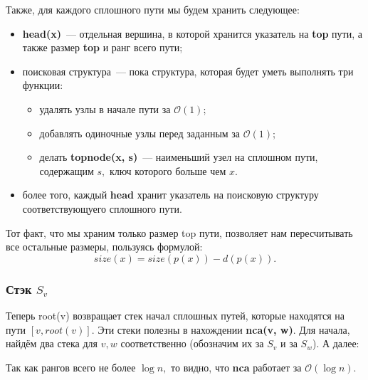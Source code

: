 Также, для каждого сплошного пути мы будем хранить следующее:
\begin{itemize}
    \item \textbf{head(x)}~--- отдельная вершина, в которой хранится указатель на \textbf{top} пути, а также размер \textbf{top} и ранг всего пути;
    \item поисковая структура~--- пока структура, которая будет уметь выполнять три функции:
    \begin{itemize}
        \item удалять узлы в начале пути за $\mathcal{O}(1)$;
        \item добавлять одиночные узлы перед заданным за $\mathcal{O}(1)$;
        \item делать \textbf{topnode(x, s)}~--- наименьший узел на сплошном пути, содержащим $s,$ ключ которого больше чем $x.$
    \end{itemize}
    \item более того, каждый \textbf{head} хранит указатель на поисковую структуру соответствующуего сплошного пути.
\end{itemize}

Тот факт, что мы храним только размер top пути, позволяет нам пересчитывать все остальные размеры, пользуясь формулой:
$$size(x) = size(p(x)) - d(p(x)).$$


\subsubsection{Стэк $S_v$}
Теперь root(v) возвращает стек начал сплошных путей, которые находятся на пути $[v, root(v)].$
Эти стеки полезны в нахождении \textbf{nca(v, w)}.  Для начала, найдём два стека для $v, w$ соответственно (обозначим их за $S_v$ и за $S_w$). А далее:

\begin{algorithmic}[1]
        \State{}
    \Else
        \EndWhile
            \State{}
        \EndIf
            \State{}
        \EndIf
            \State{}
        \EndIf
            \State{}
        \EndIf
    \EndIf
\EndProcedure
\end{algorithmic}
Так как рангов всего не более $\log{n},$ то видно, что \textbf{nca} работает за $\mathcal{O}(\log{n}).$

